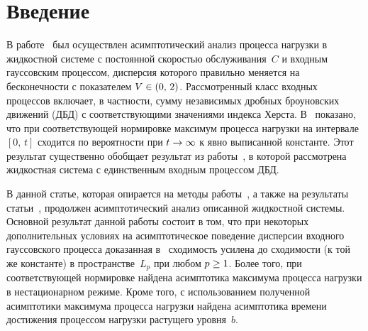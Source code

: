       \begin{multicols}{2}

            \label{st\stat}

\section{Введение}

В работе~\cite{Lukashenko} был осуществлен асимптотический анализ
процесса нагрузки в жидкостной  системе  с постоянной скоростью
обслуживания~$C$  и входным  гауссовским процессом, дисперсия
которого правильно меняется на бесконечности с показателем $V\hm\in
(0,\,2)$. Рассмотренный  класс входных процессов включает, в
частности, сумму независимых дробных броуновских движений (ДБД) с
соответствующими значениями индекса Херста. В~\cite{Lukashenko}
показано, что при соответствующей нормировке максимум  процесса нагрузки
  на интервале $[0,\,t]$ сходится по вероятности при  $t\hm\to \infty$  к  явно выписанной
константе.  Этот результат существенно обобщает результат
из работы~\cite{Zeevi}, в которой рассмотрена  жидкостная система с
единственным входным процессом ДБД.

В данной статье, которая  опирается на методы работы~\cite{Zeevi}, а
также на результаты  статьи~\cite{Lukashenko}, продолжен
асимптотический анализ описанной жидкостной системы. Основной
результат данной работы состоит в том, что при некоторых
дополнительных условиях на асимптотическое поведение дисперсии
входного гауссовского процесса доказанная  в~\cite{Lukashenko}
сходимость усилена до сходимости (к той же константе) в пространстве~$L_p$ 
при любом  $p\hm\ge 1$. Более того, при соответствующей
нормировке найдена асимптотика максимума процесса нагрузки в
нестационарном режиме. Кроме того, с использованием полученной
асимптотики максимума процесса нагрузки найдена асимптотика  времени
достижения процессом нагрузки растущего уровня~$b$.


\end{multicols}
